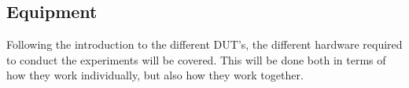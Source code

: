 \subsection{Equipment}\label{subsec:Equipment}

Following the introduction to the different DUT's, the different hardware required to conduct the experiments will be covered. This will be done both in terms of how they work individually, but also how they work together.





